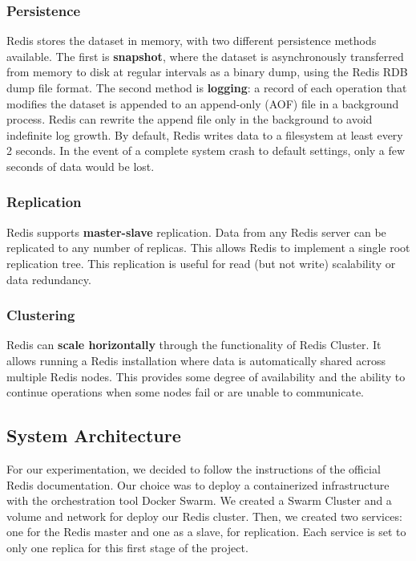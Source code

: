 \documentclass[runningheads]{llncs}
\begin{document}
\subsubsection{Persistence}
Redis stores the dataset in memory, with two different persistence methods available. The first is \textbf{snapshot}, where the dataset is asynchronously transferred from memory to disk at regular intervals as a binary dump, using the Redis RDB dump file format.
The second method is \textbf{logging}: a record of each operation that modifies the dataset is appended to an append-only (AOF) file in a background process. Redis can rewrite the append file only in the background to avoid indefinite log growth. By default, Redis writes data to a filesystem at least every 2 seconds. In the event of a complete system crash to default settings, only a few seconds of data would be lost.

\subsubsection{Replication}
Redis supports \textbf{master-slave} replication. Data from any Redis server can be replicated to any number of replicas. This allows Redis to implement a single root replication tree. This replication is useful for read (but not write) scalability or data redundancy.

\subsubsection{Clustering}
Redis can \textbf{scale horizontally} through the functionality of Redis Cluster. It allows running a Redis installation where data is automatically shared across multiple Redis nodes.
This provides some degree of availability and the ability to continue operations when some nodes fail or are unable to communicate.

\subsection{System Architecture}
For our experimentation, we decided to follow the instructions of the official Redis documentation. Our choice was to deploy a containerized infrastructure with the orchestration tool Docker Swarm. We created a Swarm Cluster and a volume and network for deploy our Redis cluster. Then, we created two services: one for the Redis master and one as a slave, for replication. Each service is set to only one replica for this first stage of the project.
\end{document}
